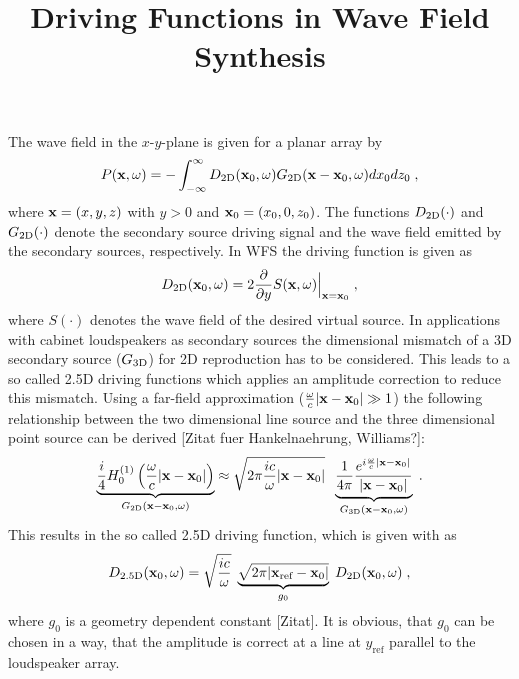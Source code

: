 \documentclass{article}
\title{Driving Functions in Wave Field Synthesis}
\begin{document}
\maketitle

The wave field in the $x$-$y$-plane is given for a planar array by
\begin{equation}
    P( \mathbf{x} ,\omega) = - \int^{\infty}_{-\infty} D_{\text{2D}}( \mathbf{x} _0,\omega)
    G_{\text{2D}}(  \mathbf{x} - \mathbf{x} _0 ,\omega) dx_0 dz_0
    \;,
    \label{eq:P}
\end{equation}
where $ \mathbf{x}  = (x,y,z)$ with $y>0$ and $ \mathbf{x} _0 = (x_0,0,z_0)$. The
functions $D_{\text{2D}}(\cdot)$ and $G_{\text{2D}}(\cdot)$ denote the
secondary source driving signal and the wave field emitted by the secondary
sources, respectively.
In WFS the driving function is given as
\begin{equation}
    D_{\text{2D}}( \mathbf{x} _0,\omega) = 2 \frac{\partial}{\partial y} S( \mathbf{x} ,\omega) \Big\vert_{ \mathbf{x}  =  \mathbf{x} _0}
    \;,
    \label{eq:D}
\end{equation}
where $S(\cdot)$ denotes the wave field of the desired virtual source.
In applications with cabinet loudspeakers as secondary sources the
dimensional mismatch of a 3D secondary source ($G_{\text{3D}}$)
for 2D reproduction has to be
considered. This leads to a so called 2.5D driving functions which applies
an amplitude correction to reduce this mismatch.
Using a far-field approximation ($ \frac{\omega}{c} |  \mathbf{x} - \mathbf{x} _0 | \gg 1$) the following
relationship between the two dimensional line source and the three dimensional
point source can be derived [Zitat fuer Hankelnaehrung, Williams?]:
\begin{equation}
    \underbrace{
        \frac{i}{4}  H_{0}^{(1)} \left( \frac{\omega}{c}  |  \mathbf{x} - \mathbf{x} _0 |\right)
    }_{G_{\text{2D}}(  \mathbf{x} - \mathbf{x} _0 ,\omega)}
    \approx 
    \sqrt{2\pi \frac{ic}{\omega} |  \mathbf{x} - \mathbf{x} _0 |}\;\;
    \underbrace{
        \frac{1}{4 \pi} \frac{e^{i \frac{\omega}{c} |  \mathbf{x} - \mathbf{x} _0 |}}{|  \mathbf{x} - \mathbf{x} _0 |}
    }_{G_{\text{3D}}(  \mathbf{x} - \mathbf{x} _0 ,\omega)} \;.
\label{eq:2D_Green_approx}
\end{equation}
This results in the so called 2.5D driving function, which is given with
 as
\begin{equation}
    D_{\text{2.5D}}( \mathbf{x} _0,\omega) = \\ 
        \sqrt{ \frac{ic}{\omega} } \;
        \underbrace{\sqrt{2\pi| \mathbf{x} _\text{ref}- \mathbf{x} _0|}}_{g_0} \;
        D_{\text{2D}}( \mathbf{x} _0,\omega) \;, 
\label{eq:D_25D}
\end{equation}
where $g_0$ is a geometry dependent constant [Zitat]. It is obvious, that
$g_0$ can be chosen in a way, that the amplitude is correct at a line at
$y_\text{ref}$ parallel to the loudspeaker array.
\end{document}

